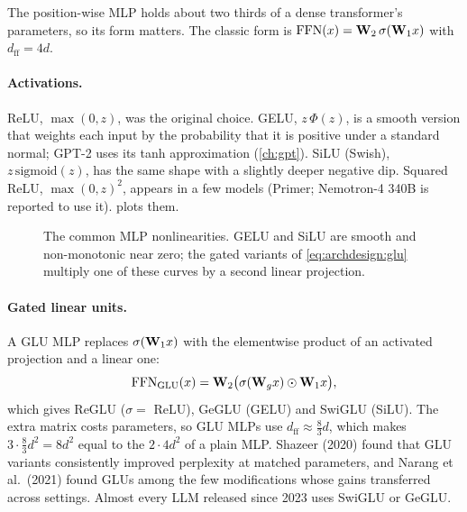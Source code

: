 The position-wise MLP holds about two thirds of a dense transformer's parameters, so its form matters.
The classic form is $\mathrm{FFN}(x)=\mathbf{W}_2\,\sigma(\mathbf{W}_1x)$ with $d_\text{ff}=4d$.

\paragraph{Activations.} ReLU, $\max(0,z)$, was the original choice. GELU,
$z\,\Phi(z)$, is a smooth version that weights each input by the probability that it is positive under
a standard normal; GPT-2 uses its tanh approximation (\cref{ch:gpt}). SiLU (Swish),
$z\,\mathrm{sigmoid}(z)$, has the same shape with a slightly deeper negative dip. Squared ReLU,
$\max(0,z)^2$, appears in a few models (Primer; Nemotron-4 340B is reported to use it). 
plots them.

\begin{figure}[t]
\centering
{}
\caption{The common MLP nonlinearities. GELU and SiLU are smooth and non-monotonic near zero; the
gated variants of \cref{eq:archdesign:glu} multiply one of these curves by a second linear projection.}
\label{fig:archdesign:acts}
\end{figure}

\paragraph{Gated linear units.} A GLU MLP replaces $\sigma(\mathbf{W}_1x)$ with the elementwise product
of an activated projection and a linear one:
\begin{equation}
\mathrm{FFN}_\text{GLU}(x) = \mathbf{W}_2\big(\sigma(\mathbf{W}_g x)\odot \mathbf{W}_1 x\big),
\label{eq:archdesign:glu}
\end{equation}
which gives ReGLU ($\sigma=$ ReLU), GeGLU (GELU) and SwiGLU (SiLU). The extra matrix costs parameters,
so GLU MLPs use $d_\text{ff}\approx\frac{8}{3}d$, which makes $3\cdot\frac83 d^2 = 8d^2$ equal to the
$2\cdot4d^2$ of a plain MLP. Shazeer (2020) found that GLU variants consistently improved perplexity at
matched parameters, and Narang et al.~(2021) found GLUs among the few modifications whose gains
transferred across settings. Almost every LLM released since 2023 uses SwiGLU or GeGLU.

